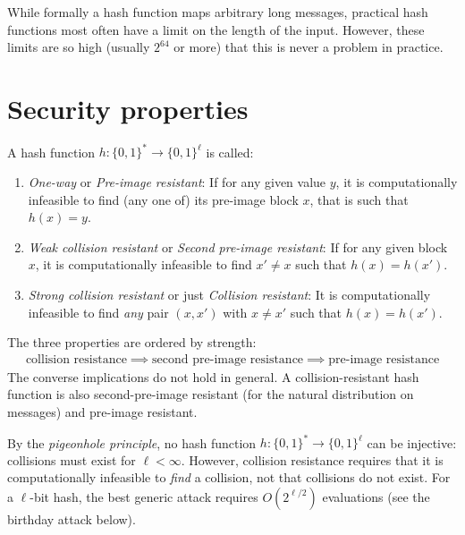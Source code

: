 \documentclass[a4paper, 12pt]{book} %
\begin{document}
While formally a hash function maps arbitrary long messages, practical hash functions most often have a limit on the length of the input. However, these limits are so high (usually $2^{64}$ or more) that this is never a problem in practice.

\section{Security properties}

\begin{definition}
    A hash function $h: \{0,1\}^* \longrightarrow \{0,1\}^\ell$ is called:
    \begin{enumerate}
        \item \emph{One-way} or \emph{Pre-image resistant}: If for any given value $y$, it is computationally infeasible to find (any one of) its pre-image block $x$, that is such that $h(x) = y$.
        \item \emph{Weak collision resistant} or \emph{Second pre-image resistant}: If for any given block $x$, it is computationally infeasible to find $x' \neq x$ such that $h(x) = h(x')$.
        \item \emph{Strong collision resistant} or just \emph{Collision resistant}: It is computationally infeasible to find \emph{any} pair $(x, x')$ with $x \neq x'$ such that $h(x) = h(x')$.
    \end{enumerate}
\end{definition}

\begin{remark}
    The three properties are ordered by strength:
    \begin{align}
        \text{collision resistance} \implies \text{second pre-image resistance} \implies \text{pre-image resistance}
    \end{align}
    The converse implications do not hold in general. A collision-resistant hash function is also second-pre-image resistant (for the natural distribution on messages) and pre-image resistant.
\end{remark}

\begin{remark}
    By the \emph{pigeonhole principle}, no hash function $h: \{0,1\}^* \to \{0,1\}^\ell$ can be injective: collisions must exist for $\ell < \infty$. However, collision resistance requires that it is computationally infeasible to \emph{find} a collision, not that collisions do not exist. For a $\ell$-bit hash, the best generic attack requires $O(2^{\ell/2})$ evaluations (see the birthday attack below).
\end{remark}
\end{document}
